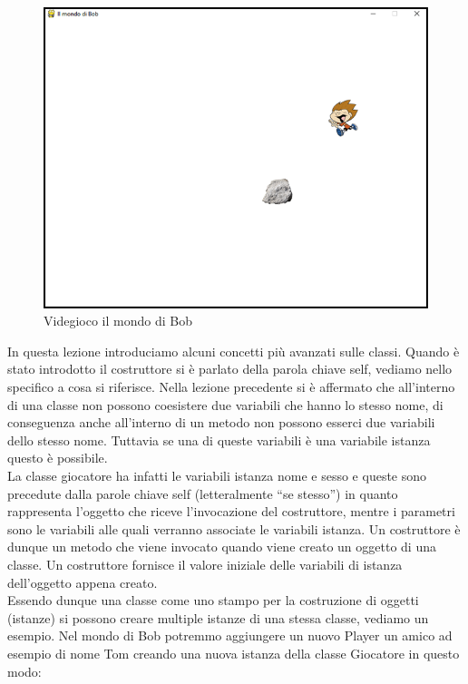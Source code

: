 \documentclass[12pt,a4paper]{article}
\begin{document}
\begin{figure}[H]
\begin{center}
    \includegraphics[width=\textwidth,height=\textheight,keepaspectratio]{img/1.png}
\end{center}
\caption{Videgioco il mondo di Bob}
\end{figure}



In questa lezione introduciamo alcuni concetti più avanzati sulle classi. Quando è stato introdotto il costruttore si è parlato della parola chiave self, vediamo nello specifico a cosa si riferisce. Nella lezione precedente si è affermato che all’interno di una classe non possono coesistere due variabili che hanno lo stesso nome, di conseguenza anche all’interno di un metodo non possono esserci due variabili dello stesso nome. Tuttavia se una di queste variabili è una variabile istanza questo è possibile. \\
La classe giocatore ha infatti le variabili istanza nome e sesso e queste sono precedute dalla parole chiave self (letteralmente “se stesso”) in quanto rappresenta l’oggetto che riceve l’invocazione del costruttore, mentre i parametri sono le variabili alle quali verranno associate le variabili istanza. Un costruttore è dunque un metodo che viene invocato quando viene creato un oggetto di una classe. Un costruttore fornisce il valore iniziale delle variabili di istanza dell’oggetto appena creato.\\
Essendo dunque una classe come uno stampo per la costruzione di oggetti (istanze) si possono creare multiple istanze di una stessa classe, vediamo un esempio. Nel mondo di Bob potremmo aggiungere un nuovo Player un amico ad esempio di nome Tom creando una nuova istanza della classe Giocatore in questo modo:
\end{document}
